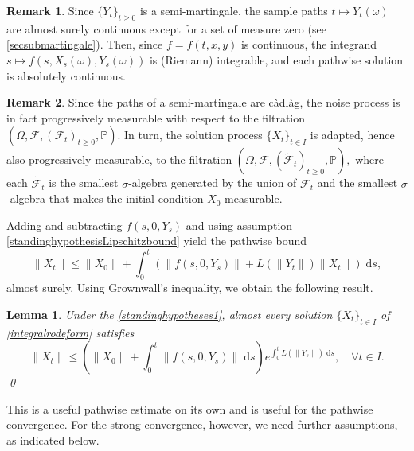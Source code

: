 \documentclass[reqno,12pt]{amsart}
\theoremstyle{plain} %
\newtheorem{lemma}{Lemma}[section]
\theoremstyle{definition} %
\newtheorem{remark}{Remark}[section]
\begin{document}
\begin{remark}
    Since $\{Y_t\}_{t\geq 0}$ is a semi-martingale, the sample paths $t \mapsto Y_t(\omega)$ are almost surely continuous except for a set of measure zero (see \cref{secsubmartingale}). Then, since $f=f(t, x, y)$ is continuous, the integrand $s \mapsto f(s, X_s(\omega), Y_s(\omega))$ is (Riemann) integrable, and each pathwise solution is absolutely continuous.
\end{remark}

\begin{remark}
    Since the paths of a semi-martingale are c\`adl\`ag, the noise process is in fact progressively measurable with respect to the filtration $(\Omega, \mathcal{F}, (\mathcal{F}_t)_{t\geq 0}, \mathbb{P}).$ In turn, the solution process $\{X_t\}_{t\in I}$ is adapted, hence also progressively measurable, to the filtration $(\Omega, \mathcal{F}, (\tilde{\mathcal{F}}_t)_{t\geq 0}, \mathbb{P}),$ where each $\tilde{\mathcal{F}}_t$ is the smallest $\sigma$-algebra generated by the union of $\mathcal{F}_t$ and the smallest $\sigma$-algebra that makes the initial condition $X_0$ measurable.
\end{remark}

Adding and subtracting $f(s, 0, Y_s)$ and using assumption \eqref{standinghypothesisLipschitzbound} yield the pathwise bound
\[
    \|X_t\| \leq \|X_0\| + \int_0^t \left(\|f(s, 0, Y_s)\| + L(\|Y_t\|)\|X_t\|\right)\;\mathrm{d}s,
\]
almost surely. Using Grownwall's inequality, we obtain the following result.
\begin{lemma}
    Under the \cref{standinghypotheses1}, almost every solution $\{X_t\}_{t\in I}$ of \eqref{integralrodeform} satisfies
    \begin{equation}
        \label{XtboundLXMt}
        \|X_t\| \leq \left(\|X_0\| + \int_0^t \|f(s, 0, Y_s)\|\;\mathrm{d}s\right) e^{\int_0^t L(\|Y_s\|)\;\mathrm{d}s}, \quad \forall t\in I.
    \end{equation}
    \qed
\end{lemma}

This is a useful pathwise estimate on its own and is useful for the pathwise convergence. For the strong convergence, however, we need further assumptions, as indicated below.
\end{document}
